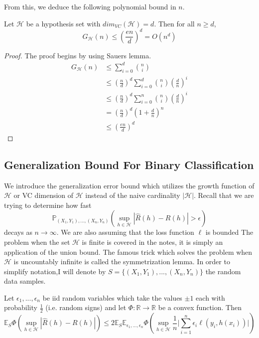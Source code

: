 From this, we deduce the following polynomial bound in $n$.
\begin{corollary}
	Let $\mathcal{H}$ be a hypothesis set with $dim_{VC}(\mathcal{H})=d$. Then for all $n\geq d $,
	\begin{equation}
	G_\mathcal{H}(n) \leq \left(\frac{en}{d} \right)^d = O(n^d)
	\end{equation}
\end{corollary}
\begin{proof}
	The proof begins by using Sauers lemma.
	\begin{align}
	G_\mathcal{H}(n) &\leq \sum_{i=0}^{d}\binom{n}{i} \\
	&\leq \left(\frac{n}{d}\right)^d \sum_{i=0}^{d}\binom{n}{i} \left(\frac{d}{n}\right)^i \\
	&\leq \left(\frac{n}{d}\right)^d \sum_{i=0}^{n}\binom{n}{i} \left(\frac{d}{n}\right)^i \\
	&= \left(\frac{n}{d}\right)^d \left(1+ \frac{d}{n}\right)^n \\
	&\leq \left(\frac{en}{d}\right)^d
	\end{align}
\end{proof}

\subsection{Generalization Bound For Binary Classification}
We introduce the generalization error bound which utilizes the growth function of $\mathcal{H}$ or VC dimension of $\mathcal{H}$ instead of the naive cardinality $|\mathcal{H}|$. Recall that we are trying to determine how fast
\begin{equation}
\mathbb{P}_{(X_1,Y_1),...,(X_n,Y_n)} \left(\sup_{h \in \mathcal{H}}|\hat{R}(h)-R(h)|>\epsilon \right)
\end{equation}
decays as $n\to \infty$. We are also assuming that the loss function $\ell$ is bounded
The problem when the set $\mathcal{H}$ is finite is covered in the notes, it is simply an
application of the union bound. The famous trick which solves the problem
when $\mathcal{H}$ is uncountably infinite is called the symmetrization lemma. In order to
simplify notation,I will denote by $S = \{(X_1,Y_1),...,(X_n,Y_n) \}$ the random data samples.
\begin{lemma}
	Let $\epsilon_1,...,\epsilon_n$ be iid random variables which take the values $\pm1$ each with probability $\frac{1}{2}$ (i.e. random signs) and let $\Phi : \mathbb{R}\to \mathbb{R}$ be a convex function. Then
	\begin{equation}
	\mathbb{E}_S\Phi\left(\sup_{h \in \mathcal{H}}|\hat{R}(h)-R(h)| \right) \leq 2\mathbb{E}_S\mathbb{E}_{\epsilon_1,...,\epsilon_n} \Phi \left(\sup_{h \in \mathcal{H}} \frac{1}{n} \bigg|\sum_{i=1}^{n}\epsilon_i \ell(y_i,h(x_i))\bigg| \right)
	\end{equation}
\end{lemma}

